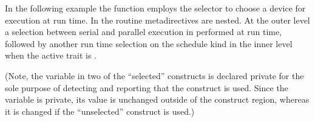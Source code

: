 In the following example the  function employs the 
selector to choose a device for execution at run time. 
In the  routine metadirectives are nested.
At the outer level a selection between serial and parallel execution in performed
at run time, followed by another run time selection on the schedule kind in the inner
level when the active  trait is . 

(Note, the variable  in two of the ``selected'' constructs is declared private for the sole purpose 
of detecting and reporting that the construct is used. Since the variable is private, its value 
is unchanged outside of the construct region, whereas it is changed if the ``unselected'' construct
is used.)






